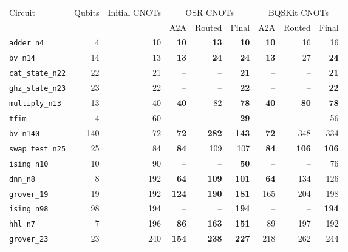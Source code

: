 
\begin{table}[p]
\centering
\scriptsize
\begin{tabular}{lrr|rrr|rrr}
\hline
Circuit & Qubits & Initial CNOTs & \multicolumn{3}{c|}{OSR CNOTs} & \multicolumn{3}{c}{BQSKit CNOTs} \\
 & & & A2A & Routed & Final & A2A & Routed & Final \\
\hline
\texttt{adder\_n4} & 4 & 10 & \textbf{10} & \textbf{13} & \textbf{10} & \textbf{10} & 16 & 16 \\
\texttt{bv\_n14} & 14 & 13 & \textbf{13} & \textbf{24} & \textbf{24} & \textbf{13} & 27 & \textbf{24} \\
\texttt{cat\_state\_n22} & 22 & 21 & -- & -- & \textbf{21} & -- & -- & \textbf{21} \\
\texttt{ghz\_state\_n23} & 23 & 22 & -- & -- & \textbf{22} & -- & -- & \textbf{22} \\
\texttt{multiply\_n13} & 13 & 40 & \textbf{40} & 82 & \textbf{78} & \textbf{40} & \textbf{80} & \textbf{78} \\
\texttt{tfim} & 4 & 60 & -- & -- & \textbf{29} & -- & -- & 56 \\
\texttt{bv\_n140} & 140 & 72 & \textbf{72} & \textbf{282} & \textbf{143} & \textbf{72} & 348 & 334 \\
\texttt{swap\_test\_n25} & 25 & 84 & \textbf{84} & 109 & 107 & \textbf{84} & \textbf{106} & \textbf{106} \\
\texttt{ising\_n10} & 10 & 90 & -- & -- & \textbf{50} & -- & -- & 76 \\
\texttt{dnn\_n8} & 8 & 192 & \textbf{64} & \textbf{109} & \textbf{101} & \textbf{64} & 134 & 126 \\
\texttt{grover\_19} & 19 & 192 & \textbf{124} & \textbf{190} & \textbf{181} & 165 & 204 & 198 \\
\texttt{ising\_n98} & 98 & 194 & -- & -- & \textbf{194} & -- & -- & \textbf{194} \\
\texttt{hhl\_n7} & 7 & 196 & \textbf{86} & \textbf{163} & \textbf{151} & 89 & 197 & 192 \\
\texttt{grover\_23} & 23 & 240 & \textbf{154} & \textbf{238} & \textbf{227} & 218 & 262 & 244 \\

\end{tabular}
\end{table}
